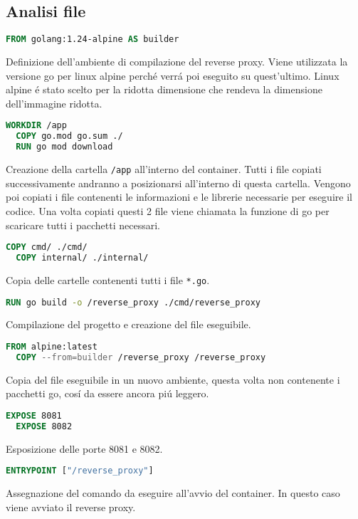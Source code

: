 \subsection{Analisi file}
\begin{lstlisting}[language=Dockerfile]
  FROM golang:1.24-alpine AS builder
\end{lstlisting}
Definizione dell'ambiente di compilazione del reverse proxy. Viene utilizzata la versione go per linux alpine perché verrá poi eseguito su quest'ultimo. Linux alpine é stato scelto per la ridotta dimensione che rendeva la dimensione dell'immagine ridotta.
\\
\begin{lstlisting}[language=Dockerfile]
  WORKDIR /app
  COPY go.mod go.sum ./
  RUN go mod download
\end{lstlisting}
Creazione della cartella \texttt{/app} all'interno del container. Tutti i file copiati successivamente andranno a posizionarsi all'interno di questa cartella. Vengono poi copiati i file contenenti le informazioni e le librerie necessarie per eseguire il codice. Una volta copiati questi 2 file viene chiamata la funzione di go per scaricare tutti i pacchetti necessari.
\\
\begin{lstlisting}[language=Dockerfile]
  COPY cmd/ ./cmd/
  COPY internal/ ./internal/
\end{lstlisting}
Copia delle cartelle contenenti tutti i file \texttt{*.go}.
\\
\begin{lstlisting}[language=Dockerfile]
  RUN go build -o /reverse_proxy ./cmd/reverse_proxy
\end{lstlisting}
Compilazione del progetto e creazione del file eseguibile.
\\
\begin{lstlisting}[language=Dockerfile]
  FROM alpine:latest
  COPY --from=builder /reverse_proxy /reverse_proxy
\end{lstlisting}
Copia del file eseguibile in un nuovo ambiente, questa volta non contenente i pacchetti go, cosí da essere ancora piú leggero.
\\
\begin{lstlisting}[language=Dockerfile]
  EXPOSE 8081
  EXPOSE 8082
\end{lstlisting}
Esposizione delle porte 8081 e 8082.
\\
\begin{lstlisting}[language=Dockerfile]
  ENTRYPOINT ["/reverse_proxy"]
\end{lstlisting}
Assegnazione del comando da eseguire all'avvio del container. In questo caso viene avviato il reverse proxy.

